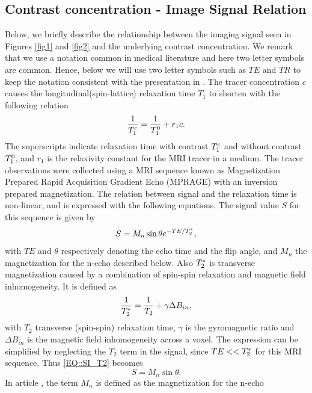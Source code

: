 \documentclass[11pt,a4paper]{article}
\begin{document}
\subsection{Contrast concentration - Image Signal Relation}
Below, we briefly describe the relationship between the imaging signal 
seen in Figures \ref{fig1} and \ref{fig2} and the underlying contrast 
concentration. We remark that we use a notation common in medical literature and here two letter symbols are common. Hence, below we will use two letter symbols such as $TE$ and $TR$ to keep the notation consistent with the presentation in \cite{GOWLAND, MPRAGE}.   
The tracer concentration $c$ causes the longitudinal(spin-lattice) relaxation time $T_{1}$ to shorten with the following relation
\begin{equation}
\frac{1}{T_{1}\sp{c}} = \frac{1}{T_{1}\sp{0}} + r_{1}c .
\label{EQ::contrast}
\end{equation}
The superscripts indicate relaxation time with contrast $T_{1}\sp{c}$ and without contrast $T_{1}\sp{0}$, and $r_1$ is the relaxivity constant for the MRI tracer in a medium. 
The tracer observations were collected using a MRI sequence known as  Magnetization Prepared Rapid Acquisition Gradient Echo (MPRAGE) with an inversion prepared magnetization. The relation between signal and the relaxation time is non-linear, and is expressed with the following equations. The signal value $S$ for this sequence is given by
\begin{equation}
S = M_{n} \sin \theta e\sp{ - TE/T_2\sp{*} },
\label{EQ::SI_T2}
\end{equation}
with $TE$ and $\theta$ respectively denoting the echo time and the flip angle, and $M_{n}$ the magnetization for the n-echo described below. 
Also $T_2\sp{*}$ is transverse magnetization caused by a combination of spin-spin relaxation and magnetic field inhomogeneity. It is defined as 
\begin{equation}
\frac{1}{T_2\sp{*}} = \frac{1}{T_2} + \gamma \Delta B_{in} ,
\end{equation}
with $T_2$ transverse (spin-spin) relaxation time, $\gamma$ is the gyromagnetic ratio and $\Delta B_{in}$ is the magnetic field inhomogeneity across a voxel. The expression can be simplified by neglecting the $T_2$ term in the signal, since $TE <<T_2\sp{*}$ for this MRI sequence. Thus \eqref{EQ::SI_T2} becomes 
\begin{equation}
S = M_{n} \sin \theta.
\label{EQ::SI}
\end{equation}
In article \cite{GOWLAND}, the term $M_n$ is defined as the magnetization for the n-echo 
\end{document}
